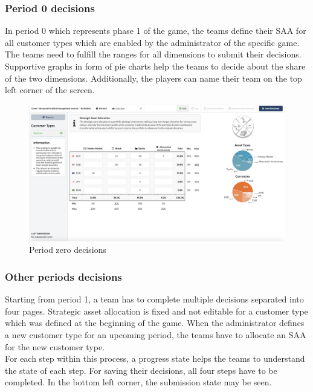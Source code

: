 \subsubsection{Period 0 decisions}
In period 0 which represents phase 1 of the game, the teams define their SAA for all customer types which are enabled by the administrator of the specific game. The teams need to fulfill the ranges for all dimensions to submit their decisions. Supportive graphs in form of pie charts help the teams to decide about the share of the two dimensions. Additionally, the players can name their team on the top left corner of the screen.
\begin{figure}[h!]
  \centering
  \includegraphics[scale=0.2]{img/application-overview/teams/02_period_zero_decisions.png}
  \caption{Period zero decisions}
\end{figure}

\subsubsection{Other periods decisions}
Starting from period 1, a team has to complete multiple decisions separated into four pages. Strategic asset allocation is fixed and not editable for a customer type which was defined at the beginning of the game. When the administrator defines a new customer type for an upcoming period, the teams have to allocate an SAA for the new customer type.\\

For each step within this process, a progress state helps the teams to understand the state of each step. For saving their decisions, all four steps have to be completed. In the bottom left corner, the submission state may be seen.

